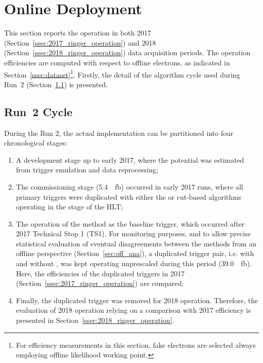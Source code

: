 \chapter{Online Deployment}%
\label{sec:operation}



This section reports the \rnn{} operation in both 2017
(Section~\ref{ssec:2017_ringer_operation}) and 2018
(Section~\ref{ssec:2018_ringer_operation}) data acquisition periods. The operation efficiencies
are computed with respect to offline electrons, as indicated in
Section~\ref{ssec:dataset}\footnote{For efficiency measurements in this section,
	fake electrons are selected always employing \veto\vloose{} offline likelihood
	working point.}. Firstly, the detail of the algorithm cycle used during Run~2
(Section~\ref{ssec:run2_rnn_cycle}) is presented.

\section{Run~2 \rnn{} Cycle}\label{ssec:run2_rnn_cycle}

During the Run 2, the actual \rnn{} implementation
can be partitioned into four chronological stages:

\begin{enumerate}[i]
  \item A development stage up to early 2017, where the \rnn{}
      potential was estimated from trigger emulation and data reprocessing;
  \item The commissioning stage (\SI{5.4}{\per\femto\barn}) occurred in
      early 2017 runs, where all primary
      triggers were duplicated with either the \rnn{} or cut-based algorithms
      operating in the \fastcalo{} stage of the HLT;
  \item The operation of the method as the baseline trigger, which occurred after 2017 Technical Stop 1 (TS1). For
    monitoring purposes, and to allow precise statistical evaluation of eventual
    disagreements between the \fastcalo{} methods from an offline
    perspective (Section~\ref{sec:off_ana}), a duplicated trigger pair, i.e.
    with and without \rnn{}, was kept operating unprescaled during this period
    (\SI{39.0}{\per\femto\barn}). Here, the efficiencies of the
    duplicated triggers in 2017 (Section~\ref{ssec:2017_ringer_operation}) are compared;
  \item Finally, the duplicated trigger was removed for 2018 operation.
    Therefore, the evaluation of 2018 \rnn{} operation relying on a comparison with
    2017 efficiency is presented in Section~\ref{ssec:2018_ringer_operation}.
\end{enumerate}

